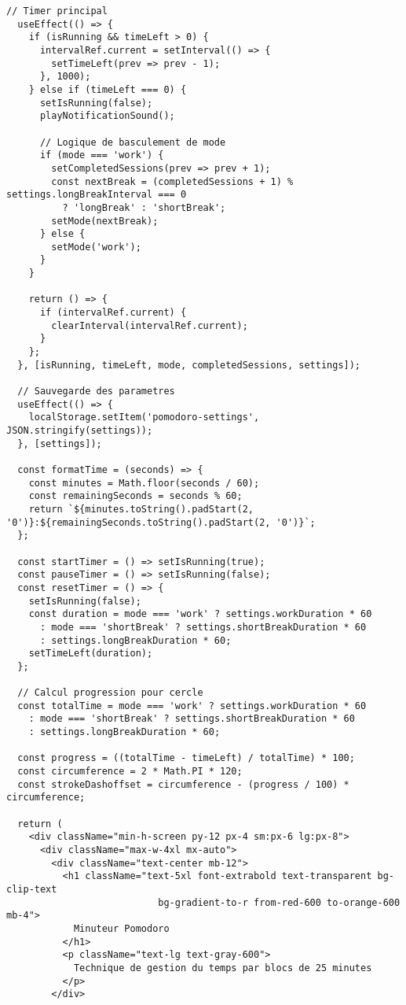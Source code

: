 \documentclass[12pt,a4paper]{article}
\begin{document}
\begin{lstlisting}[caption=Pomodoro.tsx - Timer Pomodoro complet (Robin)]
  // Timer principal
  useEffect(() => {
    if (isRunning && timeLeft > 0) {
      intervalRef.current = setInterval(() => {
        setTimeLeft(prev => prev - 1);
      }, 1000);
    } else if (timeLeft === 0) {
      setIsRunning(false);
      playNotificationSound();
      
      // Logique de basculement de mode
      if (mode === 'work') {
        setCompletedSessions(prev => prev + 1);
        const nextBreak = (completedSessions + 1) % settings.longBreakInterval === 0 
          ? 'longBreak' : 'shortBreak';
        setMode(nextBreak);
      } else {
        setMode('work');
      }
    }

    return () => {
      if (intervalRef.current) {
        clearInterval(intervalRef.current);
      }
    };
  }, [isRunning, timeLeft, mode, completedSessions, settings]);

  // Sauvegarde des parametres
  useEffect(() => {
    localStorage.setItem('pomodoro-settings', JSON.stringify(settings));
  }, [settings]);

  const formatTime = (seconds) => {
    const minutes = Math.floor(seconds / 60);
    const remainingSeconds = seconds % 60;
    return `${minutes.toString().padStart(2, '0')}:${remainingSeconds.toString().padStart(2, '0')}`;
  };

  const startTimer = () => setIsRunning(true);
  const pauseTimer = () => setIsRunning(false);
  const resetTimer = () => {
    setIsRunning(false);
    const duration = mode === 'work' ? settings.workDuration * 60
      : mode === 'shortBreak' ? settings.shortBreakDuration * 60
      : settings.longBreakDuration * 60;
    setTimeLeft(duration);
  };

  // Calcul progression pour cercle
  const totalTime = mode === 'work' ? settings.workDuration * 60
    : mode === 'shortBreak' ? settings.shortBreakDuration * 60
    : settings.longBreakDuration * 60;
  
  const progress = ((totalTime - timeLeft) / totalTime) * 100;
  const circumference = 2 * Math.PI * 120;
  const strokeDashoffset = circumference - (progress / 100) * circumference;

  return (
    <div className="min-h-screen py-12 px-4 sm:px-6 lg:px-8">
      <div className="max-w-4xl mx-auto">
        <div className="text-center mb-12">
          <h1 className="text-5xl font-extrabold text-transparent bg-clip-text 
                           bg-gradient-to-r from-red-600 to-orange-600 mb-4">
            Minuteur Pomodoro
          </h1>
          <p className="text-lg text-gray-600">
            Technique de gestion du temps par blocs de 25 minutes
          </p>
        </div>


\end{lstlisting}
\end{document}
